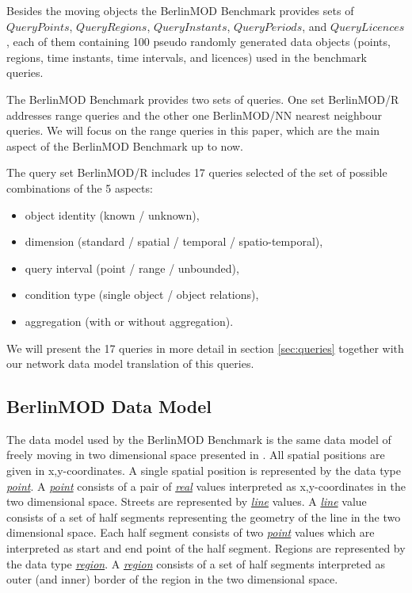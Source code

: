 \documentclass[a4paper]{article}
\newcommand{\bmodb} {BerlinMOD Benchmark}
\newcommand{\dt}[1]{\textsl{\underline{#1}}}
\begin{document}
Besides the moving objects the \bmodb{} provides sets of $QueryPoints$,
$QueryRegions$, $QueryInstants$, $QueryPeriods$, and $QueryLicences$,
each of them containing 100 pseudo randomly generated data objects (points, regions,
time instants, time intervals, and licences) used in the benchmark queries.

The \bmodb{} provides two sets of queries. One set BerlinMOD/R addresses
range queries and the  other one BerlinMOD/NN nearest neighbour queries.
We will focus on the range queries in this paper, which are the main aspect of the
\bmodb{} up to now.

The query set BerlinMOD/R includes 17 queries selected of the set of possible
combinations of the 5 aspects:
\begin{itemize}
  \item object identity (known / unknown),
  \item dimension (standard / spatial / temporal / spatio-temporal),
  \item query interval (point / range / unbounded),
  \item condition type (single object / object relations),
  \item aggregation (with or without aggregation).
\end{itemize}
We will present the 17 queries in more detail in section \ref{sec:queries}
together with our network data model translation of this queries.
\subsection{BerlinMOD Data Model}
\label{sec:bmodbdatamod}
The data model used by the \bmodb{} is the same data model of freely moving in
two dimensional space presented in \cite{594784,335426,352963}. All spatial
positions are given in x,y-coordinates. A single spatial position is represented
by the data type \dt{point}. A \dt{point} consists of a pair of \dt{real} values
interpreted as x,y-coordinates in the two dimensional space.
Streets are represented by \dt{line} values.
A \dt{line} value consists of a set of half segments representing the geometry
of the line in the two dimensional space. Each half segment consists of two
\dt{point} values
which are interpreted as start and end point of the half segment. Regions are
represented by the data type \dt{region}. A \dt{region} consists of a set of
half segments interpreted as outer (and inner) border of the region in the two
dimensional space.
\end{document}
